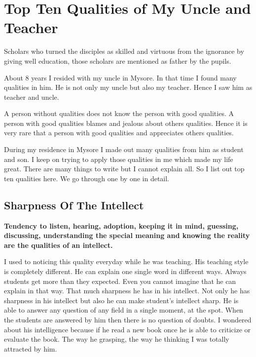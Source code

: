 \chapter{Top Ten Qualities of My Uncle and Teacher}


\begin{verse} 
\end{verse}

Scholars who turned the disciples as skilled and virtuous from the ignorance by giving well education, those scholars are mentioned as father by the pupils.
      	
About 8 years I resided with my uncle in Mysore. In that time I found many qualities in him. He is not only my uncle but also my teacher. Hence I saw him as teacher and uncle.
\begin{verse} 
\end{verse} 
A person without qualities does not know the person with good qualities. A person with good qualities blames and jealous about others qualities. Hence it is very rare that a person with good qualities and appreciates others qualities.
 
During my residence in Mysore I made out many qualities from him as student and son. I keep on trying to apply those qualities in me which made my life great. There are many things to write but I cannot explain all. So I list out top ten qualities here. We go through one by one in detail.
 
\section{Sharpness Of The Intellect {\normalsize{}}}

\begin{verse}
\end{verse}
\textbf{Tendency to listen, hearing, adoption, keeping it in mind, guessing, discussing, understanding the special meaning and knowing the reality are the qualities of an intellect.}
 
I used to noticing this quality everyday while he was teaching. His teaching style is completely different. He can explain one single word in different ways. Always students get more than they expected. Even you cannot imagine that he can explain in that way. That much sharpness he has in his intellect. Not only he has sharpness in his intellect but also he can make student’s intellect sharp.  He is able to answer any question of any field in a single moment, at the spot. When the students are answered by him then there is no question of doubts. I wondered about his intelligence because if he read a new book once he is able to criticize or evaluate the book. The way he grasping, the way he thinking I was totally attracted by him.
 
